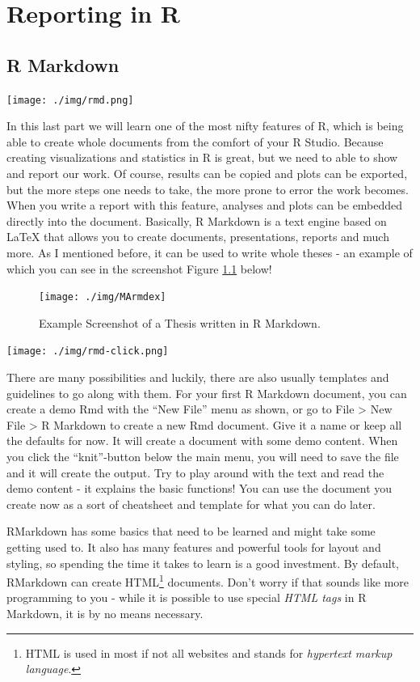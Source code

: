 \documentclass[
]{book}
\begin{document}
\part{Reporting in R}\label{part-reporting-in-r}

\chapter{R Markdown}\label{r-markdown}

\texttt{[image: ./img/rmd.png]}

In this last part we will learn one of the most nifty features of R, which is being able to create whole documents from the comfort of your R Studio.
Because creating visualizations and statistics in R is great, but we need to able to show and report our work.
Of course, results can be copied and plots can be exported, but the more steps one needs to take, the more prone to error the work becomes. When you write a report with this feature, analyses and plots can be embedded directly into the document.
Basically, R Markdown is a text engine based on LaTeX that allows you to create documents, presentations, reports and much more.
As I mentioned before, it can be used to write whole theses - an example of which you can see in the screenshot Figure \ref{fig:maexample} below!

\begin{figure}
\texttt{[image: ./img/MArmdex]} \caption{Example Screenshot of a Thesis written in R Markdown.}\label{fig:maexample}
\end{figure}

\texttt{[image: ./img/rmd-click.png]}

There are many possibilities and luckily, there are also usually templates and guidelines to go along with them.
For your first R Markdown document, you can create a demo Rmd with the ``New File'' menu as shown, or go to File \textgreater{} New File \textgreater{} R Markdown to create a new Rmd document.
Give it a name or keep all the defaults for now.
It will create a document with some demo content.
When you click the ``knit''-button below the main menu, you will need to save the file and it will create the output.
Try to play around with the text and read the demo content - it explains the basic functions!
You can use the document you create now as a sort of cheatsheet and template for what you can do later.

RMarkdown has some basics that need to be learned and might take some getting used to.
It also has many features and powerful tools for layout and styling, so spending the time it takes to learn is a good investment.
By default, RMarkdown can create HTML\footnote{HTML is used in most if not all websites and stands for \emph{hypertext markup language}.} documents.
Don't worry if that sounds like more programming to you - while it is possible to use special \emph{HTML tags} in R Markdown, it is by no means necessary.
\end{document}
